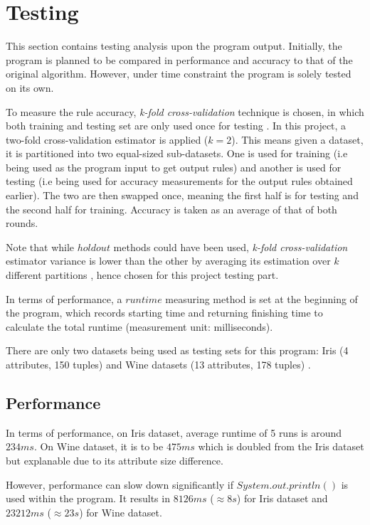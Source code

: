 \chapter{Testing}

This section contains testing analysis upon the program output. Initially, the program is planned to be compared in performance and accuracy to that of the original algorithm. However, under time constraint the program is solely tested on its own.

To measure the rule accuracy, \textit{k-fold cross-validation} technique is chosen, in which both training and testing set are only used once for testing \cite{datamining}. In this project, a two-fold cross-validation estimator is applied ($k=2$). This means given a dataset, it is partitioned into two equal-sized sub-datasets. One is used for training (i.e being used as the program input to get output rules) and another is used for testing (i.e being used for accuracy measurements for the output rules obtained earlier). The two are then swapped once, meaning the first half is for testing and the second half for training. Accuracy is taken as an average of that of both rounds.

Note that while $holdout$ methods could have been used, \textit{k-fold cross-validation} estimator variance is lower than the other by averaging its estimation over $k$ different partitions \cite{Kohavi95astudy}, hence chosen for this project testing part.

In terms of performance, a $runtime$ measuring method is set at the beginning of the program, which records starting time and returning finishing time to calculate the total runtime (measurement unit: milliseconds).

There are only two datasets being used as testing sets for this program: Iris (4 attributes, 150 tuples) and Wine datasets (13 attributes, 178 tuples) \cite{ucirepo}.


\section{Performance}

In terms of performance, on Iris dataset, average runtime of 5 runs is around $234ms$. On Wine dataset, it is to be $475ms$ which is doubled from the Iris dataset but explanable due to its attribute size difference.

However, performance can slow down significantly if $System.out.println()$ is used within the program. It results in $8126ms$ ($\approx 8s$) for Iris dataset and $23212ms$ ($\approx 23s$) for Wine dataset.  

